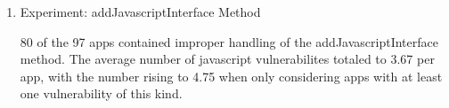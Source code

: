 \begin{enumerate}
    \item Experiment: addJavascriptInterface Method
    
    80 of the 97 apps contained improper handling of the addJavascriptInterface
    method. The average number of javascript vulnerabilites totaled to 
    3.67 per app, with the number rising to 4.75 when only considering
    apps with at least one vulnerability of this kind.

\end{enumerate}





